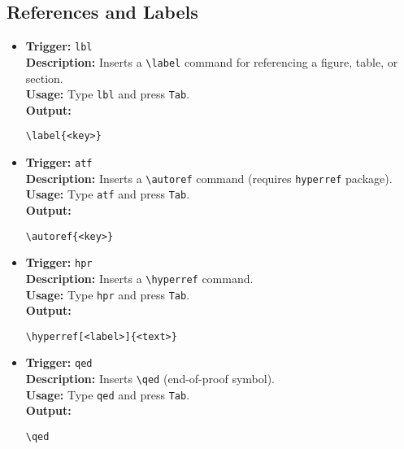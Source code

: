 \documentclass{article}
\begin{document}
\subsection{References and Labels}
\begin{itemize}[leftmargin=*, label={}]
\item \textbf{Trigger:} \texttt{lbl} \\
\textbf{Description:} Inserts a \verb|\label| command for referencing a figure, table, or section. \\
\textbf{Usage:} Type \texttt{lbl} and press \texttt{Tab}. \\
\textbf{Output:}
\begin{verbatim}
\label{<key>}
\end{verbatim}

\item \textbf{Trigger:} \texttt{atf} \\
\textbf{Description:} Inserts a \verb|\autoref| command (requires \texttt{hyperref} package). \\
\textbf{Usage:} Type \texttt{atf} and press \texttt{Tab}. \\
\textbf{Output:}
\begin{verbatim}
\autoref{<key>}
\end{verbatim}

\item \textbf{Trigger:} \texttt{hpr} \\
\textbf{Description:} Inserts a \verb|\hyperref| command. \\
\textbf{Usage:} Type \texttt{hpr} and press \texttt{Tab}. \\
\textbf{Output:}
\begin{verbatim}
\hyperref[<label>]{<text>}
\end{verbatim}

\item \textbf{Trigger:} \texttt{qed} \\
\textbf{Description:} Inserts \verb|\qed| (end-of-proof symbol). \\
\textbf{Usage:} Type \texttt{qed} and press \texttt{Tab}. \\
\textbf{Output:}
\begin{verbatim}
\qed
\end{verbatim}
\end{itemize}
\end{document}
